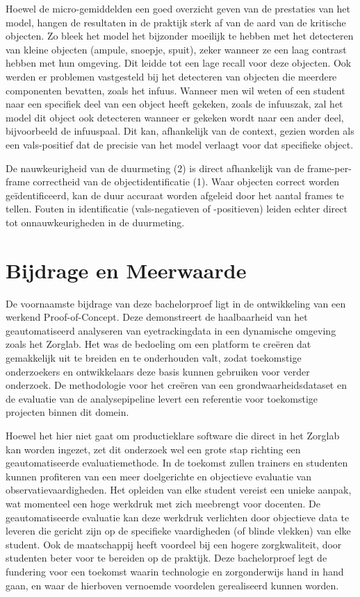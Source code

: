 Hoewel de micro-gemiddelden een goed overzicht geven van de prestaties van het model, hangen de resultaten in de praktijk 
sterk af van de aard van de kritische objecten. 
Zo bleek het model het bijzonder moeilijk te hebben met het detecteren van kleine objecten (ampule, snoepje, spuit), zeker wanneer ze een laag contrast hebben met hun omgeving.
Dit leidde tot een lage recall voor deze objecten.
Ook werden er problemen vastgesteld bij het detecteren van objecten die meerdere componenten bevatten, zoals het infuus.
Wanneer men wil weten of een student naar een specifiek deel van een object heeft gekeken, zoals de infuuszak, 
zal het model dit object ook detecteren wanneer er gekeken wordt naar een ander deel, bijvoorbeeld de infuuspaal.
Dit kan, afhankelijk van de context, gezien worden als een vals-positief dat de precisie van het model verlaagt voor dat specifieke object.

De nauwkeurigheid van de duurmeting (2) is direct afhankelijk van de frame-per-frame correctheid van de objectidentificatie (1).
Waar objecten correct worden geïdentificeerd, kan de duur accuraat worden afgeleid door het aantal frames te tellen. 
Fouten in identificatie (vals-negatieven of -positieven) leiden echter direct tot onnauwkeurigheden in de duurmeting.

\section{Bijdrage en Meerwaarde}

De voornaamste bijdrage van deze bachelorproef ligt in de ontwikkeling van een werkend Proof-of-Concept.
Deze demonstreert de haalbaarheid van het geautomatiseerd analyseren van eyetrackingdata in een dynamische omgeving zoals het Zorglab.
Het was de bedoeling om een platform te creëren dat gemakkelijk uit te breiden en te onderhouden valt, zodat toekomstige onderzoekers 
en ontwikkelaars deze basis kunnen gebruiken voor verder onderzoek.
De methodologie voor het creëren van een grondwaarheidsdataset en de evaluatie van de analysepipeline 
levert een referentie voor toekomstige projecten binnen dit domein.

Hoewel het hier niet gaat om productieklare software die direct in het Zorglab kan worden ingezet, 
zet dit onderzoek wel een grote stap richting een geautomatiseerde evaluatiemethode.
In de toekomst zullen trainers en studenten kunnen profiteren van een meer doelgerichte en objectieve evaluatie van observatievaardigheden.
Het opleiden van elke student vereist een unieke aanpak, wat momenteel een hoge werkdruk met zich meebrengt voor docenten.
De geautomatiseerde evaluatie kan deze werkdruk verlichten door objectieve data te 
leveren die gericht zijn op de specifieke vaardigheden (of blinde vlekken) van elke student. 
Ook de maatschappij heeft voordeel bij een hogere zorgkwaliteit, door studenten beter voor te bereiden op de praktijk.
Deze bachelorproef legt de fundering voor een toekomst waarin technologie en zorgonderwijs hand in hand gaan,
en waar de hierboven vernoemde voordelen gerealiseerd kunnen worden.

